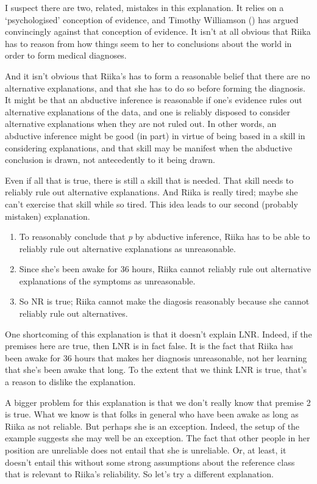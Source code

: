 \documentclass[
  10pt,
  letterpaper,
  twoside]{scrbook}
\providecommand{\tightlist}{%
  \setlength{\itemsep}{0pt}\setlength{\parskip}{0pt}}\usepackage{longtable,booktabs,array}
\begin{document}
I suspect there are two, related, mistakes in this explanation. It
relies on a `psychologised' conception of evidence, and Timothy
Williamson () has argued convincingly
against that conception of evidence. It isn't at all obvious that
{Riika} has to reason from how things seem to her to conclusions about
the world in order to form medical diagnoses.

And it isn't obvious that {Riika}'s has to form a reasonable belief that
there are no alternative explanations, and that she has to do so before
forming the diagnosis. It might be that an abductive inference is
reasonable if one's evidence rules out alternative explanations of the
data, and one is reliably disposed to consider alternative explanations
when they are not ruled out. In other words, an abductive inference
might be good (in part) in virtue of being based in a skill in
considering explanations, and that skill may be manifest when the
abductive conclusion is drawn, not antecedently to it being drawn.

Even if all that is true, there is still a skill that is needed. That
skill needs to reliably rule out alternative explanations. And {Riika}
is really tired; maybe she can't exercise that skill while so tired.
This idea leads to our second (probably mistaken) explanation.

\begin{enumerate}
\def\labelenumi{\arabic{enumi}.}
\tightlist
\item
  To reasonably conclude that \emph{p} by abductive inference, {Riika}
  has to be able to reliably rule out alternative explanations as
  unreasonable.
\item
  Since she's been awake for 36 hours, {Riika} cannot reliably rule out
  alternative explanations of the symptoms as unreasonable.
\item
  So NR is true; {Riika} cannot make the diagosis reasonably because she
  cannot reliably rule out alternatives.
\end{enumerate}

One shortcoming of this explanation is that it doesn't explain LNR.
Indeed, if the premises here are true, then LNR is in fact false. It is
the fact that {Riika} has been awake for 36 hours that makes her
diagnosis unreasonable, not her learning that she's been awake that
long. To the extent that we think LNR is true, that's a reason to
dislike the explanation.

A bigger problem for this explanation is that we don't really know that
premise 2 is true. What we know is that folks in general who have been
awake as long as {Riika} as not reliable. But perhaps she is an
exception. Indeed, the setup of the example suggests she may well be an
exception. The fact that other people in her position are unreliable
does not entail that she is unreliable. Or, at least, it doesn't entail
this without some strong assumptions about the reference class that is
relevant to {Riika}'s reliability. So let's try a different explanation.
\end{document}
